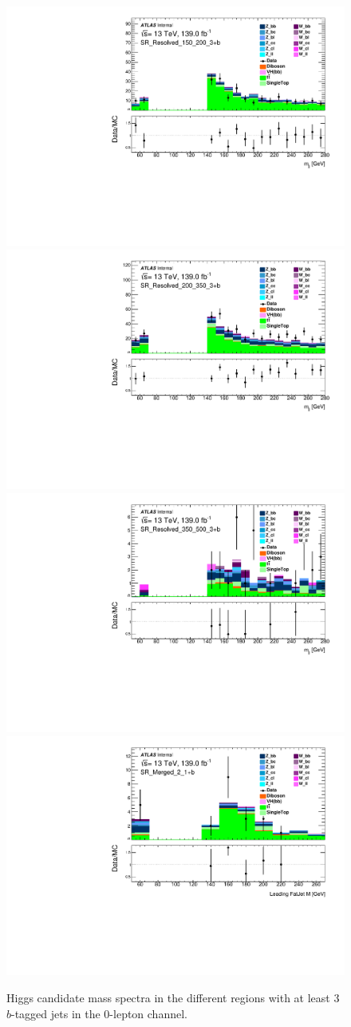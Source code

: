 \begin{figure}[!htb]
    \includegraphics[width=0.46\linewidth]{chapters/c8/figures/0L/DataMC_MonoH_Nominal_SR_Resolved_150_200_3+b_m_jj_10GeV.pdf}
    \includegraphics[width=0.46\linewidth]{chapters/c8/figures/0L/DataMC_MonoH_Nominal_SR_Resolved_200_350_3+b_m_jj_10GeV.pdf}\\
    \includegraphics[width=0.46\linewidth]{chapters/c8/figures/0L/DataMC_MonoH_Nominal_SR_Resolved_350_500_3+b_m_jj_10GeV.pdf}
    \includegraphics[width=0.46\linewidth]{chapters/c8/figures/0L/DataMC_MonoH_Nominal_SR_Merged_2_1+b_fatjets_m1_20GeV.pdf}
    \caption{Higgs candidate mass spectra in the different \met regions with at least 3 $b$-tagged jets in the 0-lepton channel.}
    \label{fig:data-mc-0l-mjj-3+b}
\end{figure}

